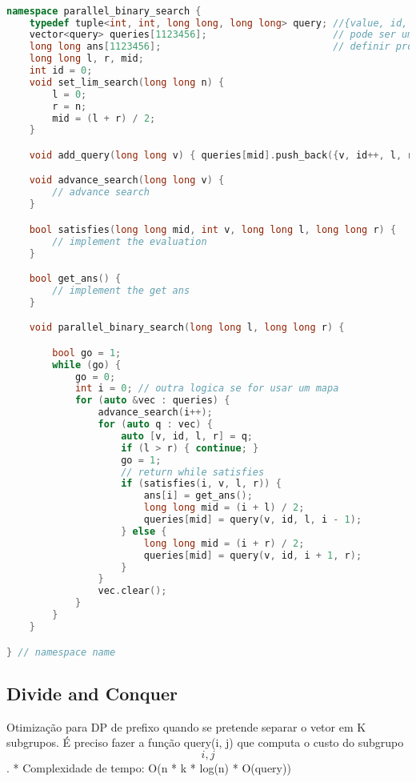 \documentclass[11pt, a4paper, twoside]{article}
\begin{document}
\begin{lstlisting}[language=C++]

namespace parallel_binary_search {
    typedef tuple<int, int, long long, long long> query; //{value, id, l, r}
    vector<query> queries[1123456];                      // pode ser um mapa se for muito esparso
    long long ans[1123456];                              // definir pro tamanho das queries
    long long l, r, mid;
    int id = 0;
    void set_lim_search(long long n) {
        l = 0;
        r = n;
        mid = (l + r) / 2;
    }

    void add_query(long long v) { queries[mid].push_back({v, id++, l, r}); }

    void advance_search(long long v) {
        // advance search
    }

    bool satisfies(long long mid, int v, long long l, long long r) {
        // implement the evaluation
    }

    bool get_ans() {
        // implement the get ans
    }

    void parallel_binary_search(long long l, long long r) {

        bool go = 1;
        while (go) {
            go = 0;
            int i = 0; // outra logica se for usar um mapa
            for (auto &vec : queries) {
                advance_search(i++);
                for (auto q : vec) {
                    auto [v, id, l, r] = q;
                    if (l > r) { continue; }
                    go = 1;
                    // return while satisfies
                    if (satisfies(i, v, l, r)) {
                        ans[i] = get_ans();
                        long long mid = (i + l) / 2;
                        queries[mid] = query(v, id, l, i - 1);
                    } else {
                        long long mid = (i + r) / 2;
                        queries[mid] = query(v, id, i + 1, r);
                    }
                }
                vec.clear();
            }
        }
    }

} // namespace name
\end{lstlisting}

\subsection{Divide and Conquer}



Otimização para DP de prefixo quando se pretende separar o vetor em K subgrupos.    
É preciso fazer a função query(i, j) que computa o custo do subgrupo \[i, j\].
* Complexidade de tempo: O(n * k * log(n) *  O(query))
\end{document}
